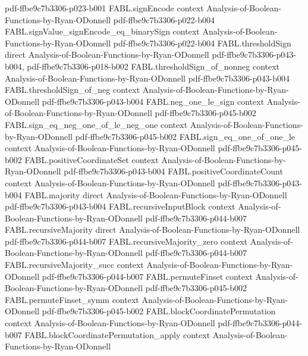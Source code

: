 \begin{theorem}
  {pdf-ffbe9c7b3306-p023-b001}
\proofstep
  {FABL.signEncode}
  {context}
  {Analysis-of-Boolean-Functions-by-Ryan-ODonnell}
  {pdf-ffbe9c7b3306-p022-b004}
\proofstep
  {FABL.signValue_signEncode_eq_binarySign}
  {context}
  {Analysis-of-Boolean-Functions-by-Ryan-ODonnell}
  {pdf-ffbe9c7b3306-p022-b004}
\proofstep
  {FABL.thresholdSign}
  {direct}
  {Analysis-of-Boolean-Functions-by-Ryan-ODonnell}
  {pdf-ffbe9c7b3306-p043-b004,
    pdf-ffbe9c7b3306-p018-b002}
\proofstep
  {FABL.thresholdSign_of_nonneg}
  {context}
  {Analysis-of-Boolean-Functions-by-Ryan-ODonnell}
  {pdf-ffbe9c7b3306-p043-b004}
\proofstep
  {FABL.thresholdSign_of_neg}
  {context}
  {Analysis-of-Boolean-Functions-by-Ryan-ODonnell}
  {pdf-ffbe9c7b3306-p043-b004}
\proofstep
  {FABL.neg_one_le_sign}
  {context}
  {Analysis-of-Boolean-Functions-by-Ryan-ODonnell}
  {pdf-ffbe9c7b3306-p045-b002}
\proofstep
  {FABL.sign_eq_neg_one_of_le_neg_one}
  {context}
  {Analysis-of-Boolean-Functions-by-Ryan-ODonnell}
  {pdf-ffbe9c7b3306-p045-b002}
\proofstep
  {FABL.sign_eq_one_of_one_le}
  {context}
  {Analysis-of-Boolean-Functions-by-Ryan-ODonnell}
  {pdf-ffbe9c7b3306-p045-b002}
\proofstep
  {FABL.positiveCoordinateSet}
  {context}
  {Analysis-of-Boolean-Functions-by-Ryan-ODonnell}
  {pdf-ffbe9c7b3306-p043-b004}
\proofstep
  {FABL.positiveCoordinateCount}
  {context}
  {Analysis-of-Boolean-Functions-by-Ryan-ODonnell}
  {pdf-ffbe9c7b3306-p043-b004}
\proofstep
  {FABL.majority}
  {direct}
  {Analysis-of-Boolean-Functions-by-Ryan-ODonnell}
  {pdf-ffbe9c7b3306-p043-b004}
\proofstep
  {FABL.recursiveInputBlock}
  {context}
  {Analysis-of-Boolean-Functions-by-Ryan-ODonnell}
  {pdf-ffbe9c7b3306-p044-b007}
\proofstep
  {FABL.recursiveMajority}
  {direct}
  {Analysis-of-Boolean-Functions-by-Ryan-ODonnell}
  {pdf-ffbe9c7b3306-p044-b007}
\proofstep
  {FABL.recursiveMajority_zero}
  {context}
  {Analysis-of-Boolean-Functions-by-Ryan-ODonnell}
  {pdf-ffbe9c7b3306-p044-b007}
\proofstep
  {FABL.recursiveMajority_succ}
  {context}
  {Analysis-of-Boolean-Functions-by-Ryan-ODonnell}
  {pdf-ffbe9c7b3306-p044-b007}
\proofstep
  {FABL.permuteFinset}
  {context}
  {Analysis-of-Boolean-Functions-by-Ryan-ODonnell}
  {pdf-ffbe9c7b3306-p045-b002}
\proofstep
  {FABL.permuteFinset_symm}
  {context}
  {Analysis-of-Boolean-Functions-by-Ryan-ODonnell}
  {pdf-ffbe9c7b3306-p045-b002}
\proofstep
  {FABL.blockCoordinatePermutation}
  {context}
  {Analysis-of-Boolean-Functions-by-Ryan-ODonnell}
  {pdf-ffbe9c7b3306-p044-b007}
\proofstep
  {FABL.blockCoordinatePermutation_apply}
  {context}
  {Analysis-of-Boolean-Functions-by-Ryan-ODonnell}

\end{theorem}
